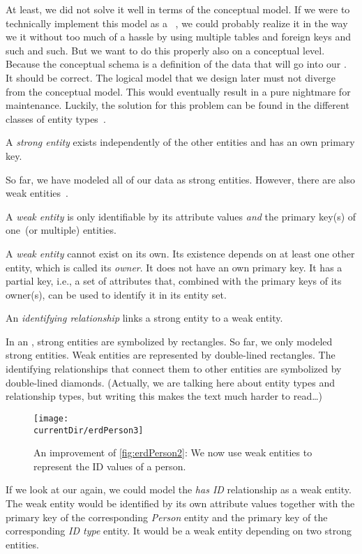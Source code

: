 At least, we did not solve it well in terms of the conceptual model.
If we were to technically implement this model as a \postgresql\ \db, we could probably realize it in the way we  it without too much of a hassle by using multiple tables and foreign keys and such and such.
But we want to do this properly also on a conceptual level.
Because the conceptual schema is a definition of the data that will go into our \db.
It should be correct.
The logical model that we design later must not diverge from the conceptual model.
This would eventually result in a pure nightmare for maintenance.
Luckily, the solution for this problem can be found in the different classes of entity types~\cite{S2024D:CDMERDE}.%
%
\begin{definition}%
A \emph{strong entity} exists independently of the other entities and has an own primary key.%
\end{definition}%
%
So far, we have modeled all of our data as strong entities.
However, there are also weak entities~\cite{P2006CITRD:CERDTRM,SS2005EIDDDFDB:CDDICAMP,S2024D:CDMERDE}.%
%
\begin{definition}%
A \emph{weak entity} is only identifiable by its attribute values \emph{and} the primary key(s) of one~(or multiple) entities.%
\end{definition}%
%
A \emph{weak entity} cannot exist on its own.
Its existence depends on at least one other entity, which is called its \emph{owner}.
It does not have an own primary key.
It has a partial key, i.e., a set of attributes that, combined with the primary keys of its owner(s), can be used to identify it in its entity set.%
%
\begin{definition}%
An \emph{identifying relationship} links a strong entity to a weak entity.%
\end{definition}%
%
In an , strong entities are symbolized by rectangles.
So far, we only modeled strong entities.
Weak entities are represented by double-lined rectangles.
The identifying relationships that connect them to other entities are symbolized by double-lined diamonds.
(Actually, we are talking here about entity types and relationship types, but writing this makes the text much harder to read\dots)

\begin{figure}%
\centering%
\texttt{[image: \\currentDir/erdPerson3]}%
\caption{An improvement of \cref{fig:erdPerson2}: We now use weak entities to represent the ID values of a person.}%
\label{fig:erdPerson3}%
\end{figure}%
%
If we look at our  again, we could model the \emph{has ID} relationship as a weak entity.
The weak entity would be identified by its own attribute values together with the primary key of the corresponding \emph{Person} entity and the primary key of the corresponding \emph{ID type} entity.
It would be a weak entity depending on two strong entities.

